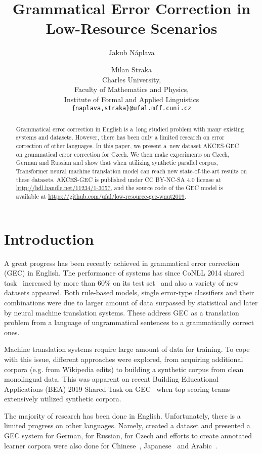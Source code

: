 \documentclass[11pt,a4paper]{article}
\title{Grammatical Error Correction in Low-Resource Scenarios}
\author{Jakub N\'{a}plava \and Milan Straka\\
  Charles University, \\
  Faculty of Mathematics and Physics, \\
  Institute of Formal and Applied Linguistics \\
  \texttt{\{naplava,straka\}@ufal.mff.cuni.cz}}
\date{}
\begin{document}
\maketitle
\begin{abstract}
  Grammatical error correction in English is a~long studied problem with many existing systems and datasets. However, there has been only a limited research on error correction of other languages. In this paper, we present a~new dataset AKCES-GEC on grammatical error correction for Czech. We then make experiments on Czech, German and Russian and show that when utilizing synthetic parallel corpus, Transformer neural machine translation model can reach new state-of-the-art results on these datasets. AKCES-GEC is published under CC BY-NC-SA 4.0 license at \url{http://hdl.handle.net/11234/1-3057}, and the source code of the GEC model is available at \url{https://github.com/ufal/low-resource-gec-wnut2019}.
\end{abstract}

\section{Introduction}

A great progress has been recently achieved in grammatical error correction (GEC) in English. The performance of systems has since CoNLL 2014 shared task~\cite{ng2014conll} increased by more than 60\% on its test set~\cite{bryant2019bea} and also a variety of new datasets appeared. Both rule-based models, single error-type classifiers and their combinations were due to larger amount of data surpassed by statistical and later by neural machine translation systems. These address GEC as a translation problem from a language of ungrammatical sentences to a grammatically correct ones. 

Machine translation systems require large amount of data for training. To cope with this issue, different approaches were explored, from acquiring additional corpora (e.g. from Wikipedia edits) to building a synthetic corpus from clean monolingual data. This was apparent on recent Building Educational Applications (BEA) 2019 Shared Task on GEC~\cite{bryant2019bea} when top scoring teams extensively utilized synthetic corpora.

The majority of research has been done in English. Unfortunately, there is a limited progress on other languages. Namely,  created a dataset and presented a GEC system for German,  for Russian,  for Czech and efforts to create annotated learner corpora were also done for Chinese~\cite{yu2014overview}, Japanese~\cite{mizumoto2011mining} and Arabic~\cite{zaghouani2015large}. 
\end{document}
